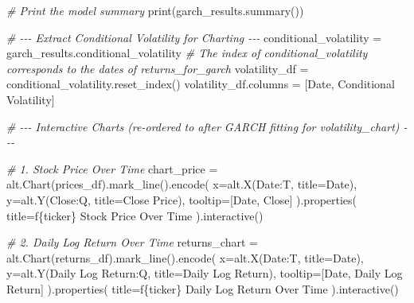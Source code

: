 \documentclass[
  11pt,
]{article}
\newenvironment{Shaded}{}{}
\newcommand{\BuiltInTok}[1]{\textcolor[rgb]{0.00,0.50,0.00}{#1}}
\newcommand{\CommentTok}[1]{\textcolor[rgb]{0.38,0.63,0.69}{\textit{#1}}}
\newcommand{\NormalTok}[1]{#1}
\newcommand{\OperatorTok}[1]{\textcolor[rgb]{0.40,0.40,0.40}{#1}}
\newcommand{\SpecialCharTok}[1]{\textcolor[rgb]{0.25,0.44,0.63}{#1}}
\newcommand{\SpecialStringTok}[1]{\textcolor[rgb]{0.73,0.40,0.53}{#1}}
\newcommand{\StringTok}[1]{\textcolor[rgb]{0.25,0.44,0.63}{#1}}
\begin{document}
\begin{Shaded}
\begin{Highlighting}[]
\CommentTok{\# Print the model summary}
\BuiltInTok{print}\NormalTok{(garch\_results.summary())}


\CommentTok{\# {-}{-}{-} Extract Conditional Volatility for Charting {-}{-}{-}}
\NormalTok{conditional\_volatility }\OperatorTok{=}\NormalTok{ garch\_results.conditional\_volatility}
\CommentTok{\# The index of conditional\_volatility corresponds to the dates of returns\_for\_garch}
\NormalTok{volatility\_df }\OperatorTok{=}\NormalTok{ conditional\_volatility.reset\_index()}
\NormalTok{volatility\_df.columns }\OperatorTok{=}\NormalTok{ [}\StringTok{\textquotesingle{}Date\textquotesingle{}}\NormalTok{, }\StringTok{\textquotesingle{}Conditional Volatility\textquotesingle{}}\NormalTok{]}


\CommentTok{\# {-}{-}{-} Interactive Charts (re{-}ordered to after GARCH fitting for volatility\_chart) {-}{-}{-}}

\CommentTok{\# 1. Stock Price Over Time}
\NormalTok{chart\_price }\OperatorTok{=}\NormalTok{ alt.Chart(prices\_df).mark\_line().encode(}
\NormalTok{    x}\OperatorTok{=}\NormalTok{alt.X(}\StringTok{\textquotesingle{}Date:T\textquotesingle{}}\NormalTok{, title}\OperatorTok{=}\StringTok{\textquotesingle{}Date\textquotesingle{}}\NormalTok{),}
\NormalTok{    y}\OperatorTok{=}\NormalTok{alt.Y(}\StringTok{\textquotesingle{}Close:Q\textquotesingle{}}\NormalTok{, title}\OperatorTok{=}\StringTok{\textquotesingle{}Close Price\textquotesingle{}}\NormalTok{),}
\NormalTok{    tooltip}\OperatorTok{=}\NormalTok{[}\StringTok{\textquotesingle{}Date\textquotesingle{}}\NormalTok{, }\StringTok{\textquotesingle{}Close\textquotesingle{}}\NormalTok{]}
\NormalTok{).properties(}
\NormalTok{    title}\OperatorTok{=}\SpecialStringTok{f\textquotesingle{}}\SpecialCharTok{\{}\NormalTok{ticker}\SpecialCharTok{\}}\SpecialStringTok{ Stock Price Over Time\textquotesingle{}}
\NormalTok{).interactive()}

\CommentTok{\# 2. Daily Log Return Over Time}
\NormalTok{returns\_chart }\OperatorTok{=}\NormalTok{ alt.Chart(returns\_df).mark\_line().encode(}
\NormalTok{    x}\OperatorTok{=}\NormalTok{alt.X(}\StringTok{\textquotesingle{}Date:T\textquotesingle{}}\NormalTok{, title}\OperatorTok{=}\StringTok{\textquotesingle{}Date\textquotesingle{}}\NormalTok{),}
\NormalTok{    y}\OperatorTok{=}\NormalTok{alt.Y(}\StringTok{\textquotesingle{}Daily Log Return:Q\textquotesingle{}}\NormalTok{, title}\OperatorTok{=}\StringTok{\textquotesingle{}Daily Log Return\textquotesingle{}}\NormalTok{),}
\NormalTok{    tooltip}\OperatorTok{=}\NormalTok{[}\StringTok{\textquotesingle{}Date\textquotesingle{}}\NormalTok{, }\StringTok{\textquotesingle{}Daily Log Return\textquotesingle{}}\NormalTok{]}
\NormalTok{).properties(}
\NormalTok{    title}\OperatorTok{=}\SpecialStringTok{f\textquotesingle{}}\SpecialCharTok{\{}\NormalTok{ticker}\SpecialCharTok{\}}\SpecialStringTok{ Daily Log Return Over Time\textquotesingle{}}
\NormalTok{).interactive()}


\end{Highlighting}
\end{Shaded}
\end{document}
